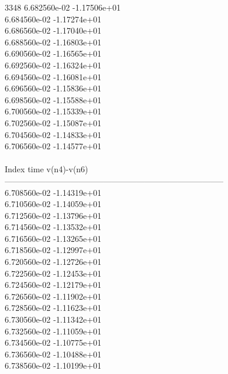 3348	6.682560e-02	-1.17506e+01	\\ 	6.684560e-02	-1.17274e+01	\\ 	6.686560e-02	-1.17040e+01	\\ 	6.688560e-02	-1.16803e+01	\\ 	6.690560e-02	-1.16565e+01	\\ 	6.692560e-02	-1.16324e+01	\\ 	6.694560e-02	-1.16081e+01	\\ 	6.696560e-02	-1.15836e+01	\\ 	6.698560e-02	-1.15588e+01	\\ 	6.700560e-02	-1.15339e+01	\\ 	6.702560e-02	-1.15087e+01	\\ 	6.704560e-02	-1.14833e+01	\\ 	6.706560e-02	-1.14577e+01	\\ \hline
\\ \hline
Index   time            v(n4)-v(n6)     \\ \hline
--------------------------------------------------------------------------------\\ 	6.708560e-02	-1.14319e+01	\\ 	6.710560e-02	-1.14059e+01	\\ 	6.712560e-02	-1.13796e+01	\\ 	6.714560e-02	-1.13532e+01	\\ 	6.716560e-02	-1.13265e+01	\\ 	6.718560e-02	-1.12997e+01	\\ 	6.720560e-02	-1.12726e+01	\\ 	6.722560e-02	-1.12453e+01	\\ 	6.724560e-02	-1.12179e+01	\\ 	6.726560e-02	-1.11902e+01	\\ 	6.728560e-02	-1.11623e+01	\\ 	6.730560e-02	-1.11342e+01	\\ 	6.732560e-02	-1.11059e+01	\\ 	6.734560e-02	-1.10775e+01	\\ 	6.736560e-02	-1.10488e+01	\\ 	6.738560e-02	-1.10199e+01	\\ \hline
